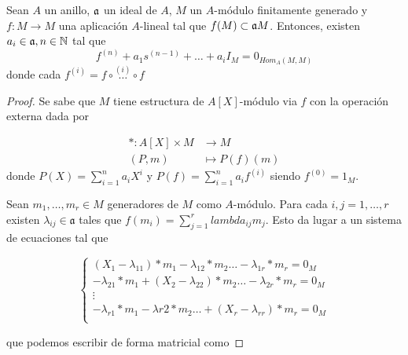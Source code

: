 \documentclass[../main.tex]{subfiles}
\begin{document}
\begin{theorem} Sean $A$ un anillo, $\mathfrak{a}$ un ideal de $A$, $M$ un $A$-módulo finitamente generado y $f:M\longrightarrow M$ una aplicación $A$-lineal tal que $f(M)\subset \mathfrak{a} M$. Entonces, existen $a_i\in\mathfrak{a}, n\in\mathbb{N}$ tal que $$f^{(n)}+a_1s^{(n-1)}+\dots+a_iI_M=0_{Hom_A(M,M)}$$
donde cada $f^{(i)}=f\circ\overset{(i)}{\dots}\circ f$
\end{theorem}
\begin{proof}
	Se sabe que $M$ tiene estructura de $A[X]$-módulo via $f$ con la operación externa dada por

	\begin{align}
		\ast: A[X] \times M & \to M \\
		(P, m) &\mapsto P(f)(m)
	\end{align}
	donde $P(X) = \sum_{i=1}^n a_i X^i$ y $P(f) = \sum_{i=1}^n a_i f^{(i)}$ siendo $f^{(0)}=1_M$.

	Sean $m_1, \dots, m_r \in M$ generadores de $M$ como $A$-módulo. Para cada $i,j=1, \dots, r$ existen $\lambda_{ij}\in \mathfrak a$ tales que $f(m_i) = \sum_{j=1}^r lambda_{ij}m_j$. Esto da lugar a un sistema de ecuaciones tal que

	\begin{equation}
		\begin{cases}
			(X_1 - \lambda_{11})\ast m_1 - \lambda_{12}\ast m_2 \dots - \lambda_{1r}\ast m_r = 0_M \\
			-\lambda_{21}\ast m_1 + (X_2 - \lambda_{22})\ast m_2 \dots - \lambda_{2r}\ast m_r = 0_M \\
			\vdots \\
			-\lambda_{r1}\ast m_1 - \lambda{r2}\ast m_2 \dots + (X_r - \lambda_{rr})\ast m_r = 0_M \\
		\end{cases}
	\end{equation}

	que podemos escribir de forma matricial como


\end{proof}
\end{document}
